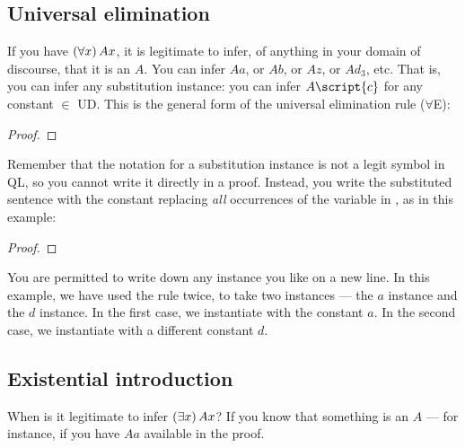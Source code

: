 


\subsection{Universal elimination}

If you have $(\forall x) \, Ax$, it is legitimate to infer, of anything in your domain of discourse, that it is an $A$. You can infer $Aa$, or $Ab$, or $Az$, or $Ad_3$, etc. That is, you can infer any substitution instance: you can infer $A\script{c}$ for any constant  $\in$ UD. This is the general form of the universal elimination rule ($\forall$E):

\begin{proof}
	 
\end{proof}


Remember that the notation for a substitution instance is not a legit symbol in QL, so you cannot write it directly in a proof. Instead, you write the substituted sentence with the constant  replacing \textit{all} occurrences of the variable  in \metaA{}, as in this example:

\begin{proof}
	 \pr{}
	 
	 
\end{proof}

You are permitted to write down any instance you like on a new line. In this example, we have used the rule twice, to take two instances --- the $a$ instance and the $d$ instance. In the first case, we instantiate with the constant $a$. In the second case, we instantiate with a different constant $d$. 

\subsection{Existential introduction}

When is it legitimate to infer $(\exists x) \, Ax$? If you know that something is an $A$ --- for instance, if you have $Aa$ available in the proof.

